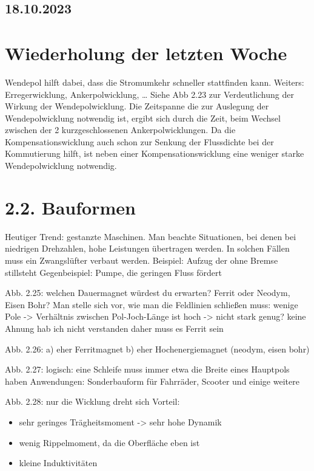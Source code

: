 \documentclass[a4paper]{article}
\begin{document}
\subsection*{18.10.2023}

\section*{Wiederholung der letzten Woche}
Wendepol hilft dabei, dass die Stromumkehr schneller stattfinden kann.
Weiters: Erregerwicklung, Ankerpolwicklung, \ldots\newline
Siehe Abb 2.23 zur Verdeutlichung der Wirkung  der Wendepolwicklung.
Die Zeitspanne die zur Auslegung der Wendepolwicklung notwendig ist, ergibt sich durch die Zeit, beim Wechsel zwischen der 2 kurzgeschlossenen Ankerpolwicklungen.
Da die Kompensationswicklung auch schon zur Senkung der Flussdichte bei der Kommutierung hilft, ist neben einer Kompensationswicklung eine weniger starke Wendepolwicklung notwendig.
\section*{2.2. Bauformen}
Heutiger Trend: gestanzte Maschinen. 
Man beachte Situationen, bei denen bei niedrigen Drehzahlen, hohe Leistungen übertragen werden.
In solchen Fällen muss ein Zwangslüfter verbaut werden.
Beispiel: Aufzug der ohne Bremse stillsteht
Gegenbeispiel: Pumpe, die geringen Fluss fördert

Abb. 2.25: welchen Dauermagnet würdest du erwarten? Ferrit oder Neodym, Eisen Bohr?
Man stelle sich vor, wie man die Feldlinien schließen muss:
    wenige Pole -> Verhältnis zwischen Pol-Joch-Länge ist hoch -> nicht stark genug? keine Ahnung hab ich nicht verstanden
daher muss es Ferrit sein

Abb. 2.26: a) eher Ferritmagnet b) eher Hochenergiemagnet (neodym, eisen bohr)

Abb. 2.27: logisch: eine Schleife muss immer etwa die Breite eines Hauptpols haben
Anwendungen: Sonderbauform für Fahrräder, Scooter und einige weitere

Abb. 2.28: nur die Wicklung dreht sich
Vorteil:
\begin{itemize}
\item sehr geringes Trägheitsmoment -> sehr hohe Dynamik
\item wenig Rippelmoment, da die Oberfläche eben ist
\item kleine Induktivitäten
\end{itemize}
\end{document}
